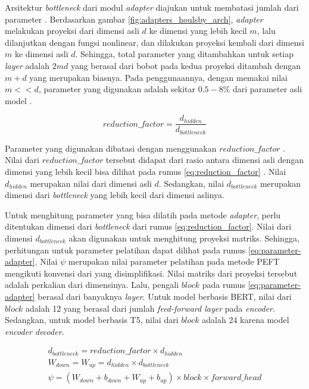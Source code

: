 Arsitektur \textit{bottleneck} dari modul \textit{adapter} diajukan untuk membatasi jumlah dari parameter \parencite{adapter_houlsby}. Berdasarkan gambar \ref{fig:adapters_houlsby_arch}, \textit{adapter} melakukan proyeksi dari dimensi asli $d$ ke dimensi yang lebih kecil $m$, lalu dilanjutkan dengan fungsi nonlinear, dan dilakukan proyeksi kembali dari dimensi $m$ ke dimensi asli $d$. Sehingga, total parameter yang ditambahkan untuk setiap \textit{layer} adalah $2md$ yang berasal dari bobot pada kedua proyeksi ditambah dengan $m+d$ yang merupakan biasnya. Pada penggunaannya, dengan memakai nilai $m << d$, parameter yang digunakan adalah sekitar $0.5-8\%$ dari parameter asli model \parencite{adapter_houlsby}.

\begin{equation}
    reduction\_factor = \frac{d_{hidden}}{d_{bottleneck}}
    \label{eq:reduction_factor}
\end{equation}

Parameter yang digunakan dibatasi dengan menggunakan $reduction\_factor$ \parencite{adapterhub}. Nilai dari $reduction\_factor$ tersebut didapat dari rasio antara dimensi asli dengan dimensi yang lebih kecil bisa dilihat pada rumus \ref{eq:reduction_factor} \parencite{adapterhub}. Nilai $d_{hidden}$ merupakan nilai dari dimensi asli $d$. Sedangkan, nilai $d_{bottleneck}$ merupakan dimensi dari \textit{bottleneck} yang lebih kecil dari dimensi aslinya.

Untuk menghitung parameter yang bisa dilatih pada metode \textit{adapter}, perlu ditentukan dimensi dari \textit{bottleneck} dari rumus \ref{eq:reduction_factor}. Nilai dari dimensi $d_{bottleneck}$ akan digunakan untuk menghitung proyeksi matriks. Sehingga, perhitungan untuk parameter pelatihan dapat dilihat pada rumus \ref{eq:parameter-adapter}. Nilai $\psi$ merupakan nilai parameter pelatihan pada metode PEFT mengikuti konvensi dari \citeauthor{adapter_houlsby} yang disimplifikasi. Nilai matriks dari proyeksi tersebut adalah perkalian dari dimensinya. Lalu, pengali $block$ pada rumus \ref{eq:parameter-adapter} berasal dari banyaknya \textit{layer}. Untuk model berbasis BERT, nilai dari $block$ adalah 12 yang berasal dari jumlah \textit{feed-forward layer} pada \textit{encoder}. Sedangkan, untuk model berbasis T5, nilai dari $block$ adalah 24 karena model \textit{encoder decoder}.

\begin{equation}
    \begin{aligned}
        d_{bottleneck} = reduction\_factor \times {d_{hidden}} \\
        W_{down} = W_{up} = d_{hidden} \times d_{bottleneck} \\
        \psi = (W_{down} + b_{down} + W_{up} + b_{up}) \times block \times forward\_head
    \end{aligned}
    \label{eq:parameter-adapter}
\end{equation}

